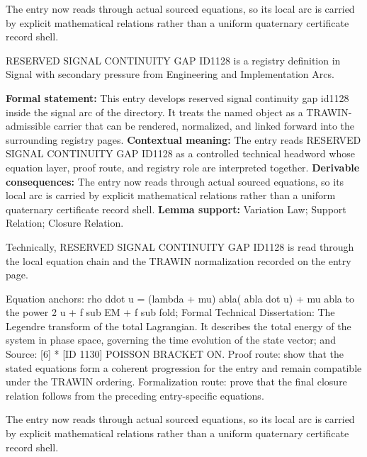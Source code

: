 The entry now reads through actual sourced equations, so its local arc is carried by explicit mathematical relations rather than a uniform quaternary certificate record shell.
\clearpage


\begingroup\small
{}
RESERVED SIGNAL CONTINUITY GAP ID1128 is a registry definition in Signal with secondary pressure from Engineering and Implementation Arcs.

\begingroup\footnotesize\setlength{\emergencystretch}{3em}\sloppy
\textbf{Formal statement:} This entry develops reserved signal continuity gap id1128 inside the signal arc of the directory. It treats the named object as a TRAWIN-admissible carrier that can be rendered, normalized, and linked forward into the surrounding registry pages. \textbf{Contextual meaning:} The entry reads RESERVED SIGNAL CONTINUITY GAP ID1128 as a controlled technical headword whose equation layer, proof route, and registry role are interpreted together. \textbf{Derivable consequences:} The entry now reads through actual sourced equations, so its local arc is carried by explicit mathematical relations rather than a uniform quaternary certificate record shell. \textbf{Lemma support:} Variation Law; Support Relation; Closure Relation.\par
\endgroup

Technically, RESERVED SIGNAL CONTINUITY GAP ID1128 is read through the local equation chain and the TRAWIN normalization recorded on the entry page.

Equation anchors: rho ddot u = (lambda + mu) abla( abla dot u) + mu abla to the power 2 u + f sub EM + f sub fold; Formal Technical Dissertation: The Legendre transform of the total Lagrangian. It describes the total energy of the system in phase space, governing the time evolution of the state vector; and Source: [6] * [ID 1130] POISSON BRACKET ON. Proof route: show that the stated equations form a coherent progression for the entry and remain compatible under the TRAWIN ordering. Formalization route: prove that the final closure relation follows from the preceding entry-specific equations.

The entry now reads through actual sourced equations, so its local arc is carried by explicit mathematical relations rather than a uniform quaternary certificate record shell.
\endgroup

